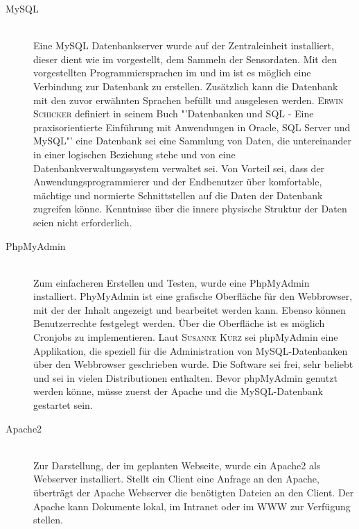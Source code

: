 \begin{description}
	\item[MySQL] \hfill \\
	Eine MySQL Datenbankserver wurde auf der Zentraleinheit installiert, dieser dient wie im  vorgestellt, dem Sammeln der Sensordaten. Mit den vorgestellten Programmiersprachen im  und im  ist es möglich eine Verbindung zur Datenbank zu erstellen. Zusätzlich kann die Datenbank mit den zuvor erwähnten Sprachen befüllt und ausgelesen werden.
	\textsc{Erwin Schicker} definiert in seinem Buch "'Datenbanken und SQL - Eine praxisorientierte Einführung mit Anwendungen in Oracle, SQL Server und MySQL"'\cite{schicker2017datenbanken} eine Datenbank sei eine Sammlung von Daten, die untereinander in einer logischen Beziehung stehe und von eine Datenbankverwaltungssystem verwaltet sei. Von Vorteil sei, dass der Anwendungsprogrammierer und der Endbenutzer über komfortable, mächtige und normierte Schnittstellen auf die Daten der Datenbank zugreifen könne. Kenntnisse über die innere physische Struktur der Daten seien nicht erforderlich.

	\item[PhpMyAdmin] \hfill \\
	Zum einfacheren Erstellen und Testen, wurde eine PhpMyAdmin installiert. PhyMyAdmin ist eine grafische Oberfläche für den Webbrowser, mit der der Inhalt angezeigt und bearbeitet werden kann. Ebenso können Benutzerrechte festgelegt werden. Über die Oberfläche ist es möglich Cronjobs zu implementieren.
	Laut \textsc{Susanne Kurz} \cite{kurz2016digital} sei phpMyAdmin eine Applikation, die speziell für die Administration von MySQL-Datenbanken über den Webbrowser geschrieben wurde. Die Software sei frei, sehr beliebt und sei in vielen Distributionen enthalten. Bevor phpMyAdmin genutzt werden könne, müsse zuerst der Apache und die MySQL-Datenbank gestartet sein.

	\item[Apache2] \hfill \\
	Zur Darstellung, der im  geplanten Webseite, wurde ein Apache2 als Webserver installiert. Stellt ein Client eine Anfrage an den Apache, überträgt der Apache Webserver die benötigten Dateien an den Client. Der Apache kann Dokumente lokal, im Intranet oder im WWW zur Verfügung stellen.

\end{description}
